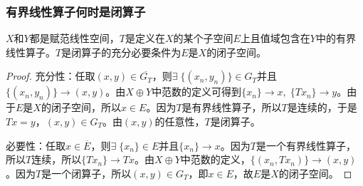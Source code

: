 \subsubsection{有界线性算子何时是闭算子}
\begin{theorem}
	$X$和$Y$都是赋范线性空间，$T$是定义在$X$的某个子空间$E$上且值域包含在$Y$中的有界线性算子。$T$是闭算子的充分必要条件为$E$是$X$的闭子空间。
\end{theorem}
\begin{proof}
	充分性：任取$(x,y)\in\overline{G_T}$，则$\exists\;\{(x_n,y_n)\}\in G_T$并且$\{(x_n,y_n)\}\to (x,y)$。由$X\oplus Y$中范数的定义可得到$\{x_n\}\to x,\;\{Tx_n\}\to y$。由于$E$是$X$的闭子空间，所以$x\in E$。因为$T$是有界线性算子，所以$T$是连续的，于是$Tx=y$，$(x,y)\in G_T$。由$(x,y)$的任意性，$T$是闭算子。\par
	必要性：任取$x\in\overline{E}$，则$\exists\;\{x_n\}\in E$并且$\{x_n\}\to x$。因为$T$是一个有界线性算子，所以$T$连续，所以$\{Tx_n\}\to Tx$。由$X\oplus Y$中范数的定义，$\{(x_n,Tx_n)\}\to(x,y)$。因为$T$是一个闭算子，所以$(x,y)\in G_T$，即$x\in E$，故$E$是$X$的闭子空间。
\end{proof}
